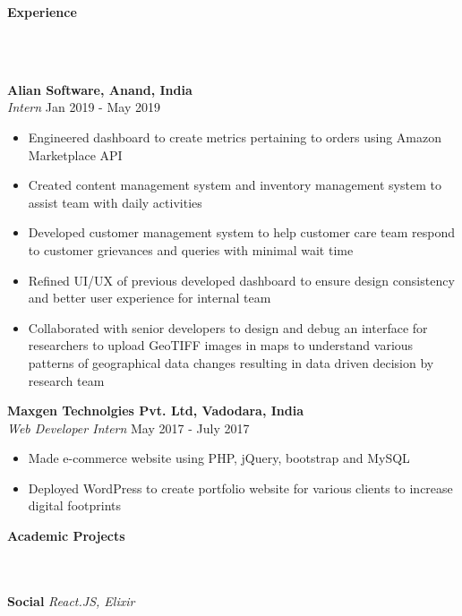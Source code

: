\documentclass[]{article}
\newcommand{\lineunder} {
    \vspace*{-8pt} \\
    \hrulefill \\
}
\newcommand{\header} [1] {
    {\vspace*{6pt} \fontsize{12}{12}\selectfont \textbf{#1}}
     \lineunder
}
\begin{document}
\header{Experience}
\vspace{1mm}

\hspace{1mm}
\textbf{Alian Software, Anand, India}\\
\hspace{1mm}
\textit{Intern} \hfill Jan 2019 - May 2019\\
\vspace{-2mm}
\begin{itemize}
    \setlength\itemsep{0.2mm}
	\item Engineered dashboard to create metrics pertaining to orders using Amazon Marketplace API
	\item Created content management system and inventory management system to assist team with daily activities
	\item Developed customer management system to help customer care team respond to customer grievances and queries with
    minimal wait time
    \item Refined UI/UX of previous developed dashboard to ensure design consistency and better user experience for internal team
    \item Collaborated with senior developers to design and debug an interface for researchers to upload GeoTIFF images in maps to
    understand various patterns of geographical data changes resulting in data driven decision by research team
\end{itemize}
\hspace{1mm}
\textbf{Maxgen Technolgies Pvt. Ltd, Vadodara, India}\\
\hspace{1mm}
\textit{Web Developer Intern} \hfill May 2017 - July 2017\\
\vspace{-2mm}
\begin{itemize}
    \setlength\itemsep{0.2mm}
	\item Made e-commerce website using PHP, jQuery, bootstrap and MySQL
	\item Deployed WordPress to create portfolio website for various clients to increase digital footprints
\end{itemize}



\header{Academic Projects}
{\hspace{2mm}\textbf{Social}} {\sl React.JS, Elixir} \\
\end{document}
